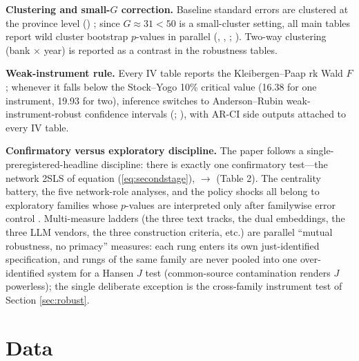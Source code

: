 \textbf{Clustering and small-$G$ correction.} Baseline standard
errors are clustered at the province level ()
\parencite{cameron2015practitioner}; since $G \approx 31 < 50$ is a
small-cluster setting, all main tables report wild cluster bootstrap
$p$-values in parallel (,
, ;
\parencite{roodman2019fast}). Two-way clustering (bank $\times$
year) is reported as a contrast in the robustness tables.

\textbf{Weak-instrument rule.} Every IV table reports the
Kleibergen--Paap rk Wald $F$; whenever it falls below the
Stock--Yogo 10\% critical value (16.38 for one instrument, 19.93
for two), inference switches to Anderson--Rubin weak-instrument-robust
confidence intervals (; \parencite{andrews2019weak}),
with AR-CI side outputs attached to every IV table.

\textbf{Confirmatory versus exploratory discipline.} The paper
follows a single-preregistered-headline discipline: there is exactly
one confirmatory test---the network 2SLS of equation
(\ref{eq:secondstage}),  $\to$
 (Table 2). The centrality battery, the five network-role
analyses, and the policy shocks all belong to exploratory families
whose $p$-values are interpreted only after familywise error control
\parencite{romano2005stepwise}. Multi-measure ladders (the three
text tracks, the dual embeddings, the three LLM vendors, the three
construction criteria, etc.) are parallel ``mutual robustness, no
primacy'' measures: each rung enters its own just-identified
specification, and rungs of the same family are never pooled into
one over-identified system for a Hansen $J$ test (common-source
contamination renders $J$ powerless); the single deliberate
exception is the cross-family instrument test of Section
\ref{sec:robust}.

\section{Data}\label{sec:data}

